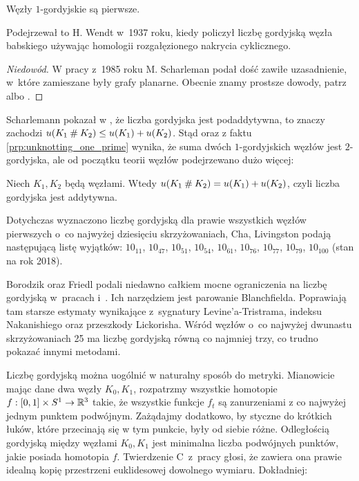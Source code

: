 \begin{proposition}
    \label{prp:unknotting_one_prime}
    Węzły $1$-gordyjskie są pierwsze.
\end{proposition}

Podejrzewał to H. Wendt w~1937 roku, kiedy policzył liczbę gordyjską węzła babskiego używając homologii rozgałęzionego nakrycia cyklicznego.

\begin{proof}[Niedowód]
    W pracy \cite{scharleman85} z~1985 roku M. Scharleman podał dość zawiłe uzasadnienie, w~które zamieszane były grafy planarne.
    Obecnie znamy prostsze dowody, patrz \cite{lackenby97} albo \cite{zhang91}.
\end{proof}

Scharlemann pokazał w \cite[wniosek 1.6]{scharlemann98}, że liczba gordyjska jest podaddytywna, to znaczy zachodzi $u(K_1 \mathbin{\#} K_2) \le u(K_1) + u(K_2)$.
Stąd oraz z faktu \ref{prp:unknotting_one_prime} wynika, że suma dwóch $1$-gordyjskich węzłów jest $2$-gordyjska, ale od początku teorii węzłów podejrzewano dużo więcej:

\begin{conjecture}
    Niech $K_1, K_2$ będą węzłami.
    Wtedy $u(K_1 \mathbin{\#} K_2) = u(K_1) + u(K_2)$, czyli liczba gordyjska jest addytywna.
\end{conjecture}

Dotychczas wyznaczono liczbę gordyjską dla prawie wszystkich węzłów pierwszych o~co najwyżej dziesięciu skrzyżowaniach,
Cha, Livingston \cite{cha05} podają następującą listę wyjątków:
$10_{11}$, $10_{47}$, $10_{51}$, $10_{54}$, $10_{61}$, $10_{76}$, $10_{77}$, $10_{79}$, $10_{100}$ (stan na rok 2018).

Borodzik oraz Friedl podali niedawno całkiem mocne ograniczenia na liczbę gordyjską w~pracach \cite{borodzik14} i~\cite{borodzik15}.
Ich narzędziem jest parowanie Blanchfielda.
Poprawiają tam starsze estymaty wynikające z~sygnatury Levine'a-Tristrama, indeksu Nakanishiego oraz przeszkody Lickorisha.
Wśród węzłów o~co najwyżej dwunastu skrzyżowaniach 25 ma liczbę gordyjską równą co najmniej trzy, co trudno pokazać innymi metodami.

Liczbę gordyjską można uogólnić w naturalny sposób do metryki.
Mianowicie mając dane dwa węzły $K_0, K_1$, rozpatrzmy wszystkie homotopie $f : [0,1] \times S^1 \to \mathbb R^3$ takie, że wszystkie funkcje $f_t$ są zanurzeniami z co najwyżej jednym punktem podwójnym.
Zażądajmy dodatkowo, by styczne do krótkich łuków, które przecinają się w tym punkcie, były od siebie różne.
Odległością gordyjską między węzłami $K_0, K_1$ jest minimalna liczba podwójnych punktów, jakie posiada homotopia $f$.
Twierdzenie C~z~pracy \cite{gambaudo05} głosi, że zawiera ona prawie idealną kopię przestrzeni euklidesowej dowolnego wymiaru.
Dokładniej:

